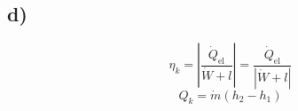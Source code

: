

\subsection*{d)}
\[
\eta_k = \left| \frac{\dot{Q}_{\text{el}}}{\dot{W} + l} \right| = \frac{\dot{Q}_{\text{el}}}{\left| \dot{W} + l \right|}
\]
\[
Q_k = \dot{m} (h_2 - h_1)
\]